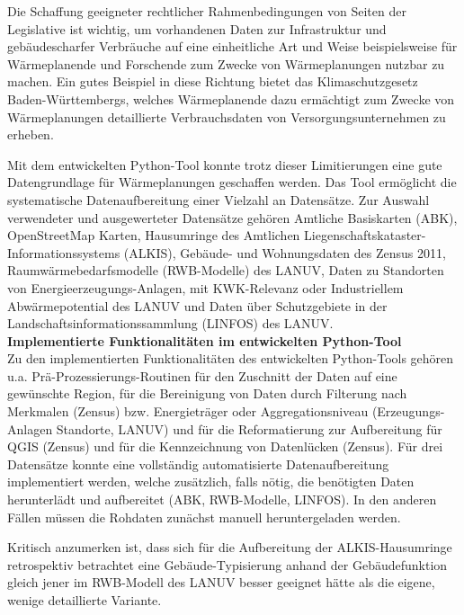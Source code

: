 		Die Schaffung geeigneter rechtlicher Rahmenbedingungen von Seiten der Legislative ist wichtig, um vorhandenen Daten zur Infrastruktur und gebäudescharfer Verbräuche auf eine einheitliche Art und Weise beispielsweise für Wärmeplanende und Forschende zum Zwecke von Wärmeplanungen nutzbar zu machen. Ein gutes Beispiel in diese Richtung bietet das Klimaschutzgesetz Baden-Württembergs, welches Wärmeplanende dazu ermächtigt zum Zwecke von Wärmeplanungen detaillierte Verbrauchsdaten von Versorgungsunternehmen zu erheben.
		
		Mit dem entwickelten Python-Tool konnte trotz dieser Limitierungen eine gute Datengrundlage für Wärmeplanungen geschaffen werden. Das Tool ermöglicht die systematische Datenaufbereitung einer Vielzahl an Datensätze. Zur Auswahl verwendeter und ausgewerteter Datensätze gehören Amtliche Basiskarten (ABK), OpenStreetMap Karten, Hausumringe des Amtlichen Liegenschaftskataster-Informationssystems (ALKIS), Gebäude- und Wohnungsdaten des Zensus 2011, Raumwärmebedarfsmodelle (RWB-Modelle) des LANUV, Daten zu Standorten von Energieerzeugungs-Anlagen, mit KWK-Relevanz oder Industriellem Abwärmepotential des LANUV und Daten über Schutzgebiete in der Landschaftsinformationssammlung (LINFOS) des LANUV. \\
		
		\textbf{Implementierte Funktionalitäten im entwickelten Python-Tool}\\
		Zu den implementierten Funktionalitäten des entwickelten Python-Tools gehören u.a. Prä-Prozessierungs-Routinen für den Zuschnitt der Daten auf eine gewünschte Region, für die Bereinigung von Daten durch Filterung nach Merkmalen (Zensus) bzw. Energieträger oder Aggregationsniveau (Erzeugungs-Anlagen Standorte, LANUV) und für die Reformatierung zur Aufbereitung für QGIS (Zensus) und für die Kennzeichnung von Datenlücken (Zensus). Für drei Datensätze konnte eine vollständig automatisierte Datenaufbereitung implementiert werden, welche zusätzlich, falls nötig, die benötigten Daten herunterlädt und aufbereitet (ABK, RWB-Modelle, LINFOS). In den anderen Fällen müssen die Rohdaten zunächst manuell heruntergeladen werden. 
		
		Kritisch anzumerken ist, dass sich für die Aufbereitung der ALKIS-Hausumringe retrospektiv betrachtet eine Gebäude-Typisierung anhand der Gebäudefunktion gleich jener im RWB-Modell des LANUV besser geeignet hätte als die eigene, wenige detaillierte Variante. 
		
